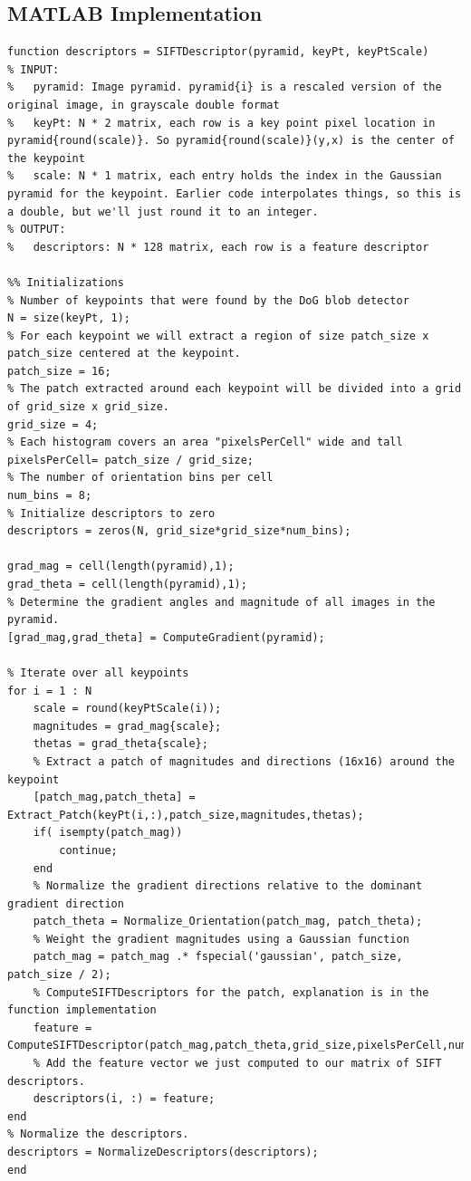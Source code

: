 \documentclass{article}
\begin{document}
\subsection{MATLAB Implementation}
\begin{lstlisting}[caption={General structure of the code for creating SIFT Descriptors.},captionpos=b]
function descriptors = SIFTDescriptor(pyramid, keyPt, keyPtScale)
% INPUT:
%   pyramid: Image pyramid. pyramid{i} is a rescaled version of the original image, in grayscale double format
%   keyPt: N * 2 matrix, each row is a key point pixel location in pyramid{round(scale)}. So pyramid{round(scale)}(y,x) is the center of the keypoint
%   scale: N * 1 matrix, each entry holds the index in the Gaussian pyramid for the keypoint. Earlier code interpolates things, so this is a double, but we'll just round it to an integer.
% OUTPUT:
%   descriptors: N * 128 matrix, each row is a feature descriptor

%% Initializations
% Number of keypoints that were found by the DoG blob detector
N = size(keyPt, 1);
% For each keypoint we will extract a region of size patch_size x patch_size centered at the keypoint.
patch_size = 16;
% The patch extracted around each keypoint will be divided into a grid of grid_size x grid_size.
grid_size = 4;
% Each histogram covers an area "pixelsPerCell" wide and tall
pixelsPerCell= patch_size / grid_size;
% The number of orientation bins per cell
num_bins = 8;
% Initialize descriptors to zero
descriptors = zeros(N, grid_size*grid_size*num_bins);

grad_mag = cell(length(pyramid),1);
grad_theta = cell(length(pyramid),1);
% Determine the gradient angles and magnitude of all images in the pyramid.
[grad_mag,grad_theta] = ComputeGradient(pyramid);

% Iterate over all keypoints
for i = 1 : N
    scale = round(keyPtScale(i));
    magnitudes = grad_mag{scale};
    thetas = grad_theta{scale};
    % Extract a patch of magnitudes and directions (16x16) around the keypoint
    [patch_mag,patch_theta] = Extract_Patch(keyPt(i,:),patch_size,magnitudes,thetas);
    if( isempty(patch_mag))
        continue;
    end
    % Normalize the gradient directions relative to the dominant gradient direction
    patch_theta = Normalize_Orientation(patch_mag, patch_theta);
    % Weight the gradient magnitudes using a Gaussian function
    patch_mag = patch_mag .* fspecial('gaussian', patch_size, patch_size / 2);
    % ComputeSIFTDescriptors for the patch, explanation is in the function implementation
    feature = ComputeSIFTDescriptor(patch_mag,patch_theta,grid_size,pixelsPerCell,num_bins);
    % Add the feature vector we just computed to our matrix of SIFT descriptors.
    descriptors(i, :) = feature;
end
% Normalize the descriptors.
descriptors = NormalizeDescriptors(descriptors);
end
\end{lstlisting}
\end{document}
